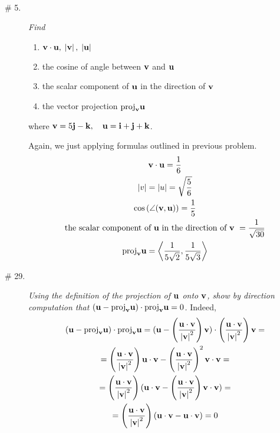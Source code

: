 \documentclass[8pt]{article} %
\begin{document}
\begin{description}
{\begin{gather*}
	\end{gather*}
}
\item[\# 5.]{
	{\it 
	Find
		\begin{enumerate}[label=\bfseries\alph*.]
			\item{$\mathbf{v}\cdot \mathbf{u},\;\left|\mathbf{v}\right|,\;\left|\mathbf{u}\right|$}
			\item{the cosine of angle between $\mathbf{v}$ and $\mathbf{u}$}
			\item{the scalar component of $\mathbf{u}$ in the direction of $\mathbf{v}$}
			\item{the vector projection $\mbox{proj}_{\mathbf{v}}{\mathbf{u}}$}
		\end{enumerate}
		where $\mathbf{v}=5\mathbf{j} -\mathbf{k},\quad \mathbf{u}=\mathbf{i}+\mathbf{j}+\mathbf{k}$.}
	Again, we just applying formulas outlined in previous problem.
	\begin{gather*}
		\mathbf{v}\cdot\mathbf{u}=\frac{1}{6}\\
		\left|v\right|=\left|u\right|=\sqrt{\frac{5}{6}}\\
		\cos\left(\angle(\mathbf{v},\mathbf{u})\right)=\frac{1}{5}\\
		\mbox{the scalar component of $\mathbf{u}$ in the direction of $\mathbf{v}$ }=\frac{1}{\sqrt{30}}\\
		\mbox{proj}_{\mathbf{v}}{\mathbf{u}}=\left<\frac{1}{5\sqrt{2}},\frac{1}{5\sqrt{3}}\right>
	\end{gather*}
	}
\item[\# 29.]{{\it Using the definition of the projection of $\mathbf{u}$ onto $\mathbf{v}$, show by direction computation that
	$(\mathbf{u}-\mbox{proj}_{\mathbf{v}}{\mathbf{u}})\cdot\mbox{proj}_{\mathbf{v}}{\mathbf{u}}=0$.
	}
	Indeed,
	\begin{gather*}
	(\mathbf{u}-\mbox{proj}_{\mathbf{v}}{\mathbf{u}})\cdot\mbox{proj}_{\mathbf{v}}{\mathbf{u}}=(\mathbf{u}-\left(\frac{\mathbf{u}\cdot\mathbf{v}}{\left|\mathbf{v}\right|^2}\right)\mathbf{v})\cdot\left(\frac{\mathbf{u}\cdot\mathbf{v}}{\left|\mathbf{v}\right|^2}\right)\mathbf{v}=\\
	=\left(\frac{\mathbf{u}\cdot\mathbf{v}}{\left|\mathbf{v}\right|^2}\right)\mathbf{u}\cdot\mathbf{v}-\left(\frac{\mathbf{u}\cdot\mathbf{v}}{\left|\mathbf{v}\right|^2}\right)^2\mathbf{v}\cdot\mathbf{v}=\\
	=\left(\frac{\mathbf{u}\cdot\mathbf{v}}{\left|\mathbf{v}\right|^2}\right)(\mathbf{u}\cdot\mathbf{v}-\left(\frac{\mathbf{u}\cdot\mathbf{v}}{\left|\mathbf{v}\right|^2}\right)\mathbf{v}\cdot\mathbf{v})=\\
	=\left(\frac{\mathbf{u}\cdot\mathbf{v}}{\left|\mathbf{v}\right|^2}\right)(\mathbf{u}\cdot\mathbf{v}-\mathbf{u}\cdot\mathbf{v})=0
	\end{gather*}
	}
\end{description}
\end{document}

